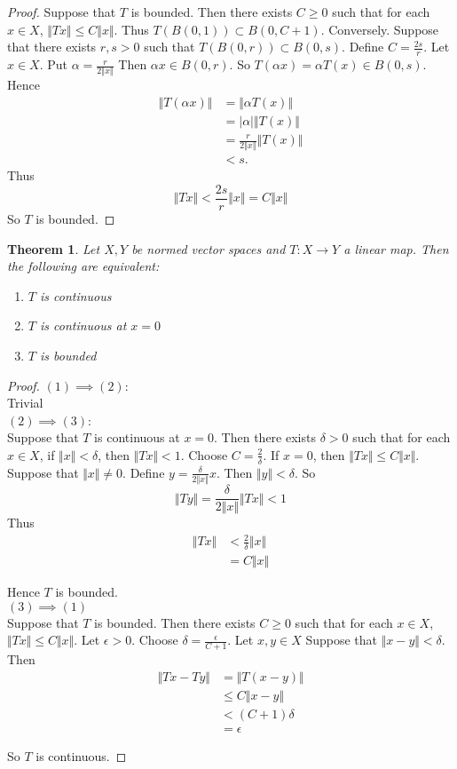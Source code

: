 \documentclass[12pt]{amsart}
\newtheorem{thm}{Theorem}[section]
\newcommand{\al}{\alpha}
\newcommand{\del}{\delta}
\newcommand{\ep}{\epsilon}
\newcommand{\n}{\Vert}
\begin{document}
\begin{proof}
Suppose that $T$ is bounded. Then there exists $C \geq 0$ such that for each $x \in X$, $\n Tx \n \leq C \n x \n$. Thus $T(B(0,1)) \subset B(0,C+1)$. Conversely. Suppose that there exists $r,s >0$ such that $T(B(0,r)) \subset B(0,s)$. Define $C = \frac{2s}{r}$. Let $x \in X$. Put $\al = \frac{r}{2\n x \n}$ Then $\al x \in B(0,r)$. So $T(\al x ) = \al T(x) \in B(0,s)$. Hence 
\begin{align*}
\n T(\al x) \n 
&= \n \al T(x) \n \\
&= \vert \al \vert \n T(x) \n \\
& = \frac{r}{2 \n x \n}  \n T(x) \n \\
& < s.
\end{align*}
Thus $$\n Tx \n < \frac{2 s}{r} \n x \n = C \n x \n $$ So $T$ is bounded. 
\end{proof}

\begin{thm}
Let $X,Y$ be normed vector spaces and $T:X \rightarrow Y$ a linear map. Then the following are equivalent:
\begin{enumerate}
\item $T$ is continuous
\item $T$ is continuous at $x=0$
\item $T$ is bounded
\end{enumerate}
\end{thm}

\begin{proof}
$(1) \implies (2)$:\\
Trivial\vspace{1cm}\\
$(2) \implies (3)$:\\
Suppose that $T$ is continuous at $x=0$. Then there exists $\del>0$ such that for each $x \in X$, if $\n x \n < \del$, then $\n Tx \n< 1$. Choose $C = \frac{2}{\del}$. If $x=0$, then $\n Tx \n \leq C \n x \n$. Suppose that $\n x \n \neq 0$. Define $y = \frac{\del}{2 \n x \n}x$. Then $\n y \n < \del$. So $$ \n Ty \n
= \frac{\del}{2 \n x \n } \n Tx \n < 1$$
Thus 
\begin{align*}
\n Tx \n 
&< \frac{2}{\del} \n x \n\\
&=C \n x \n
\end{align*}

Hence $T$ is bounded.\vspace{1cm}\\
$(3) \implies (1)$\\
Suppose that $T$ is bounded. Then there exists $C \geq 0$ such that for each $x \in X$, $\n Tx \n \leq C\n x \n$. Let $\ep >0$. Choose $\del = \frac{\ep}{C+1}$. Let $x,y \in X$ Suppose that $\n x-y \n < \del$. Then 
\begin{align*}
\n Tx-Ty \n
& = \n T(x-y) \n\\
& \leq C \n x-y \n \\
&< (C+1) \del\\ 
&= \ep
\end{align*}

So $T$ is continuous.
\end{proof}
\end{document}
